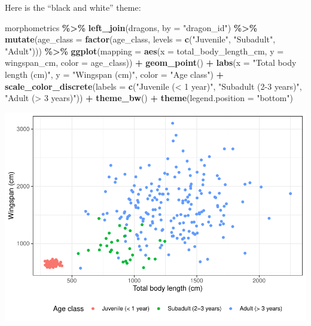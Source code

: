 \documentclass[
]{book}
\newenvironment{Shaded}{\begin{snugshade}}{\end{snugshade}}
\newcommand{\AttributeTok}[1]{\textcolor[rgb]{0.13,0.29,0.53}{#1}}
\newcommand{\FunctionTok}[1]{\textcolor[rgb]{0.13,0.29,0.53}{\textbf{#1}}}
\newcommand{\NormalTok}[1]{#1}
\newcommand{\SpecialCharTok}[1]{\textcolor[rgb]{0.81,0.36,0.00}{\textbf{#1}}}
\newcommand{\StringTok}[1]{\textcolor[rgb]{0.31,0.60,0.02}{#1}}
\begin{document}
Here is the ``black and white'' theme:

\begin{Shaded}
\begin{Highlighting}[]
\NormalTok{morphometrics }\SpecialCharTok{\%\textgreater{}\%} 
  \FunctionTok{left\_join}\NormalTok{(dragons, }\AttributeTok{by =} \StringTok{"dragon\_id"}\NormalTok{) }\SpecialCharTok{\%\textgreater{}\%} 
  \FunctionTok{mutate}\NormalTok{(}\AttributeTok{age\_class =} \FunctionTok{factor}\NormalTok{(age\_class, }\AttributeTok{levels =} \FunctionTok{c}\NormalTok{(}\StringTok{"Juvenile"}\NormalTok{,}
                                                  \StringTok{"Subadult"}\NormalTok{,}
                                                  \StringTok{"Adult"}\NormalTok{))) }\SpecialCharTok{\%\textgreater{}\%} 
\FunctionTok{ggplot}\NormalTok{(}\AttributeTok{mapping =} \FunctionTok{aes}\NormalTok{(}\AttributeTok{x =}\NormalTok{ total\_body\_length\_cm, }\AttributeTok{y =}\NormalTok{ wingspan\_cm, }\AttributeTok{color =}\NormalTok{ age\_class)) }\SpecialCharTok{+}
  \FunctionTok{geom\_point}\NormalTok{() }\SpecialCharTok{+}
  \FunctionTok{labs}\NormalTok{(}\AttributeTok{x =} \StringTok{"Total body length (cm)"}\NormalTok{, }\AttributeTok{y =} \StringTok{"Wingspan (cm)"}\NormalTok{, }\AttributeTok{color =} \StringTok{"Age class"}\NormalTok{) }\SpecialCharTok{+}
  \FunctionTok{scale\_color\_discrete}\NormalTok{(}\AttributeTok{labels =} \FunctionTok{c}\NormalTok{(}\StringTok{"Juvenile (\textless{} 1 year)"}\NormalTok{,}
                                 \StringTok{"Subadult (2{-}3 years)"}\NormalTok{,}
                                 \StringTok{"Adult (\textgreater{} 3 years)"}\NormalTok{)) }\SpecialCharTok{+}
  \FunctionTok{theme\_bw}\NormalTok{() }\SpecialCharTok{+}
  \FunctionTok{theme}\NormalTok{(}\AttributeTok{legend.position =} \StringTok{"bottom"}\NormalTok{) }
\end{Highlighting}
\end{Shaded}

\includegraphics{reproducible-science_files/figure-latex/gg14-1.pdf}
\end{document}
